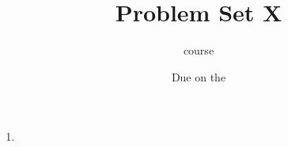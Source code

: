 




\title{Problem Set X}
\author[Daniel Gonzalez Cedre]{course}
\date{Due on the }



\maketitle

\begin{enumerate}
    \item
\end{enumerate}


